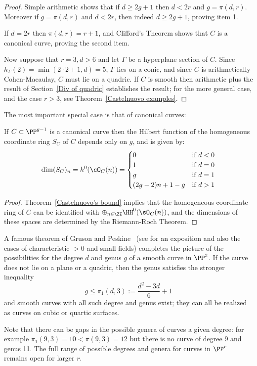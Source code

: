 \begin{proof}
Simple arithmetic shows that if $d\geq 2g+1$  then  $d<2r$ and $g= \pi(d,r)$. Moreover if $g= \pi(d,r)$ and $d<2r$,
then indeed $d\geq 2g+1$, proving item 1.

If $d= 2r$ then $\pi(d,r) = r+1$, and Clifford's Theorem shows that $C$ is a canonical curve, proving the second
item.

Now suppose that $r=3, d>6$ and let $\Gamma$ be a hyperplane 
section of $C$. Since $h_{\Gamma}(2) = \min(2\cdot 2+1, d) = 5$, $\Gamma$ lies on a conic, and 
since $C$ is arithmetically Cohen-Macaulay, $C$ must lie on a quadric. 
If $C$ is smooth then arithmetic plus the result of Section~\ref{Div of quadric} establishes the result; for the more general case,
and the case $r>3$, see Theorem~\ref{Castelnuovo examples}.
\end{proof}
The most important special case is that of canonical curves:

 \begin{corollary}\label{canonical hilbert function}
If $C\subset \PP^{g-1}$ is a canonical curve then the Hilbert function of the homogeneous coordinate ring $S_{C}$ of  $C$ depends only on $g$, and is given by:
$$
\dim({S_{C}})_{n} = h^{0}(\cO_{C}(n)) = 
\begin{cases}
 0 &\mbox {if } d<0\\
 1 & \mbox {if }  d=0\\
 g & \mbox {if }  d=1\\
 (2g-2)n + 1 - g & \mbox {if }  d>1\\
\end{cases}
$$
\end{corollary}
\begin{proof}
Theorem~\ref{Castelnuovo's bound} implies that the homogeneous coordinate ring of $C$ can be identified with $\oplus_{n\in \ZZ}\HH^0(\sO_C(n))$, and the dimensions of these spaces are determined by the Riemann-Roch Theorem.
\end{proof}


\begin{fact}
A famous theorem of Gruson and Peskine~\cite{MR0690647} (see \cite{MR0689536} for an exposition and also the cases of characteristic $>0$ and small fields) completes the picture of the possibilities for the degree $d$ and  genus $g$  of a smooth curve in $\PP^3$. If the curve does not lie on a plane or a quadric, then the genus satisfies the stronger inequality
$$
g\leq \pi_1(d,3) := \frac{d^2-3d}{6} +1
$$
and smooth curves with all such degree and genus exist; they can all be realized as curves
on cubic or quartic surfaces.

Note that there can be gaps in the possible genera of curves a given degree: for example  $\pi_1(9,3) = 10<\pi(9,3) =12$ but there is
no curve of degree 9 and genus 11. 
The full range of possible degrees and genera for curves in $\PP^r$ remains open for larger $r$. 
\end{fact}



